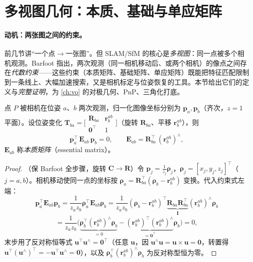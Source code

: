 \section{多视图几何：本质、基础与单应矩阵}
\label{sec:cam-epipolar}

\paragraph{动机：两张图之间的约束。}
前几节讲“一个点$\to$一张图”。但 SLAM/SfM 的核心是\emph{多视图}：同一点被多个相机观测。Barfoot\cite{barfoot2024state} 指出，两次观测（同一相机移动后、或两个相机）的像点之间存在\emph{代数约束}——这些约束（本质矩阵、基础矩阵、单应矩阵）既能把特征匹配限制到一条线上、大幅加速搜索，又是相机标定与位姿恢复的工具。本节给出它们的定义与\emph{完整证明}，为 \cref{ch:vo} 的对极几何、PnP、三角化打底。

\begin{theorem}[本质矩阵与对极约束]\label{thm:essential}
点 $P$ 被相机在位姿 $a$、$b$ 两次观测，归一化图像坐标分别为 $\mathbf{p}_a,\mathbf{p}_b$（齐次，$z=1$ 平面）。设位姿变化 $\mathbf{T}_{ba}=\big[\begin{smallmatrix}\mathbf{R}_{ba}&\mathbf{r}_b^{ab}\\\mathbf{0}^\top&1\end{smallmatrix}\big]$（旋转 $\mathbf{R}_{ba}$、平移 $\mathbf{r}_b^{ab}$），则
\begin{equation}
  \mathbf{p}_a^\top\,\mathbf{E}_{ab}\,\mathbf{p}_b=0,\qquad
  \mathbf{E}_{ab}=\mathbf{R}_{ba}^\top\,(\mathbf{r}_b^{ab})^\wedge,
  \label{eq:essential}
\end{equation}
$\mathbf{E}_{ab}$ 称\emph{本质矩阵}（essential matrix）。
\end{theorem}
\begin{proof}
（保 Barfoot 全步骤，旋转 $\mathbf{C}\to\mathbf{R}$\cite{barfoot2024state}）令 $\mathbf{p}_j=\tfrac1{z_j}\boldsymbol\rho_j$，$\boldsymbol\rho_j=[x_j,y_j,z_j]^\top$（$j=a,b$）。相机移动使同一点的坐标按 $\boldsymbol\rho_a=\mathbf{R}_{ba}^\top(\boldsymbol\rho_b-\mathbf{r}_b^{ab})$ 变换。代入约束式左端：
\[
  \mathbf{p}_a^\top\mathbf{E}_{ab}\mathbf{p}_b
  =\frac1{z_az_b}\boldsymbol\rho_a^\top\mathbf{E}_{ab}\boldsymbol\rho_b
  =\frac1{z_az_b}(\boldsymbol\rho_b-\mathbf{r}_b^{ab})^\top
  \underbrace{\mathbf{R}_{ba}\mathbf{R}_{ba}^\top}_{\mathbf{I}}(\mathbf{r}_b^{ab})^\wedge\boldsymbol\rho_b
\]
\[
  =\frac1{z_az_b}\Big(\underbrace{\boldsymbol\rho_b^\top(\mathbf{r}_b^{ab})^\wedge\boldsymbol\rho_b}_{=0}
  -\underbrace{(\mathbf{r}_b^{ab})^\top(\mathbf{r}_b^{ab})^\wedge}_{=\mathbf{0}^\top}\boldsymbol\rho_b\Big)=0,
\]
末步用了反对称恒等式 $\mathbf{u}^\top\mathbf{u}^\wedge=\mathbf{0}^\top$（任意 $\mathbf{u}$，因 $\mathbf{u}^\wedge\mathbf{u}=\mathbf{u}\times\mathbf{u}=\mathbf{0}$，转置得 $\mathbf{u}^\top(\mathbf{u}^\wedge)^\top=-\mathbf{u}^\top\mathbf{u}^\wedge=\mathbf{0}$），以及 $\boldsymbol\rho_b^\top(\mathbf{r}_b^{ab})^\wedge\boldsymbol\rho_b$ 为反对称型恒为零。
\end{proof}


